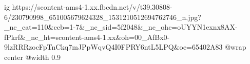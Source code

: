  
 
 
 
 

\ifcmt
  ig https://scontent-ams4-1.xx.fbcdn.net/v/t39.30808-6/230790998_651005679624328_1531210512694762746_n.jpg?_nc_cat=110&ccb=1-7&_nc_sid=5f2048&_nc_ohc=oUYYN1exnx8AX-fPkrf&_nc_ht=scontent-ams4-1.xx&oh=00_AfBx0-9lzRRRzocFpTnCkq7mJPpWqvQ4I0FPRY6ntL5LPQ&oe=65402A83
  @wrap center
  @width 0.9
\fi

